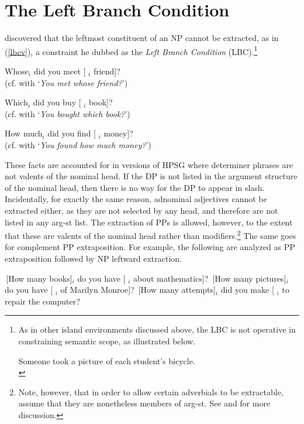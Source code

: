 \documentclass[output=paper]{langsci/langscibook}
\begin{document}

\section{The Left Branch Condition}

\citet{Ross67} discovered that the leftmost constituent of an NP cannot be extracted, 
as in  (\ref{lbcv}), a constraint he dubbed as the \emph{Left Branch Condition} (LBC).\footnote{As in other island environments discussed above, the LBC is not operative in constraining semantic scope, as illustrated below.

\ea
Someone took a picture of each student's bicycle.\\
\citep[303]{MRS}
\zlast}
 
 
\ea
\ea  \bad{*}Whose$_i$ did you meet [ \spc$_i$ friend]?\\
 (cf. with `\emph{You met whose friend?}')
 
\ex \bad{*}Which$_i$ did you buy [ \spc$_i$ book]?\\
(cf. with `\emph{You bought which book?}')

\ex \bad{*}How much$_i$ did you find [ \spc$_i$ money]?\\
(cf. with `\emph{You found how much money?}')
\z \label{lbcv}
\z

These facts are accounted for in versions of HPSG where determiner phrases
are not valents of the nominal head. If the DP is not listed in the argument structure
of the nominal head, then there is no way for the DP to appear in {\sc slash}.
Incidentally, for exactly the same reason, adnominal adjectives cannot be extracted either, as they are not selected  by any head, and therefore  are not listed in any {\sc arg-st} list. 
The extraction of PPs is allowed, however, to the extent that these are valents of the nominal head rather than modifiers.\footnote{Note, however, that in order to allow certain adverbials to be extractable,  \citet{ginzsag} assume that they are nonetheless members of {\sc arg-st}. See \citet{levhubook} and   for more discussion.}
The same goes for complement PP extraposition. For example, the following are analyzed as PP extraposition followed by NP leftward extraction.

\ea
 \ea \,[How many books]$_i$ do you have [ \spc$_i$ about mathematics]?
\ex \,[How many pictures]$_i$ do you have [ \spc$_i$ of Marilyn Monroe]?
\ex \,[How many attempts]$_i$ did you make [ \spc$_i$ to repair the computer?
\z
\z
\end{document}
